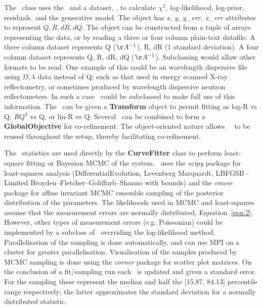 \documentclass[12pt]{article}
\begin{document}
The \Objective\ class uses the \ReflectModel\ and a dataset, \DataD, to calculate $\chi^2$, log-likelihood, log-prior, residuals, and the generative model.
The \DataD object has \emph{x, y, y\_err, x\_err} attributes to represent $Q, R, dR, dQ$. The \DataD object can be constructed from a tuple of arrays representing the data, or by reading a three or four column plain-text datafile. A three column dataset represents Q ($\AA^{-1}$), R, dR (1 standard deviation). A four column dataset represents Q, R, dR, dQ ($\AA^{-1}$). Subclassing \DataD would allow other formats to be read. One example of this could be an wavelength dispersive file using $\Omega, \lambda$ data instead of Q; such as that used in energy scanned X-ray reflectometry, or sometimes produced by wavelength dispersive neutron reflectometers. In such a case \ReflectModel\ could be subclassed to make full use of this information.
The \Objective\ can be given a \textbf{Transform} object to permit fitting as log-R vs Q, $RQ^4$ vs Q, or lin-R vs Q. Several \Objective\ can be combined to form a \textbf{GlobalObjective} for co-refinement. The object-oriented nature allows \Parameter\, \Component\ to be reused throughout the setup, thereby facilitating co-refinement.

The \Objective\ statistics are used directly by the \textbf{CurveFitter} class to perform least-square fitting or Bayesian MCMC of the system. \ uses the \emph{scipy} package for least-squares analysis (DifferentialEvolution, Levenberg Marquardt, LBFGSB - Limited Broyden–Fletcher–Goldfarb–Shanno with bounds) and the  \emph{emcee} package \cite{emcee} for affine invariant MCMC ensemble sampling of the posterior distribution of the parameters. The likelihoods used in MCMC and least-squares assume that the measurement errors are normally distributed, Equation~\ref{eqn:2}. However, other types of measurement errors (e.g. Poissonian) could be implemented by a subclass of \Objective\  overriding the log-likelihood method.
Parallelisation of the sampling is done automatically, and can use MPI on a cluster for greater parallelisation. Visualisation of the samples produced by MCMC sampling is done using the \emph{corner} package \cite{corner} for scatter plot matrices. On the conclusion of a fit/sampling run each \Parameter\ is updated and given a standard error. For the sampling these represent the median and half the [15.87, 84.13] percentile range respectively; the latter approximates the standard deviation for a normally distributed statistic.
\end{document}
